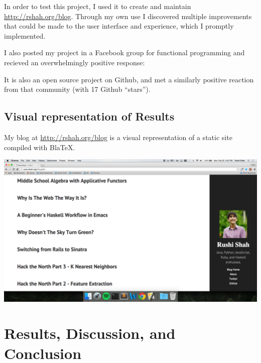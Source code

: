 \documentclass[doc,apacite,12pt]{apa6}
\begin{document}
In order to test this project, I used it to create and maintain \url{http://rshah.org/blog}. Through my own use I discovered multiple improvements that could be made to the user interface and experience, which I promptly implemented. 

I also posted my project in a Facebook group for functional programming and recieved an overwhelmingly positive response: 


It is also an open source project on Github, and met a similarly positive reaction from that community (with 17 Github ``stars''). 

\subsection{Visual representation of Results}

My blog at \url{http://rshah.org/blog} is a visual representation of a static site compiled with BlaTeX.

\centerline{\includegraphics[width=.8\textwidth]{BlaTeX_screenshot}}

\section{Results, Discussion, and Conclusion}



% 
\end{document}
